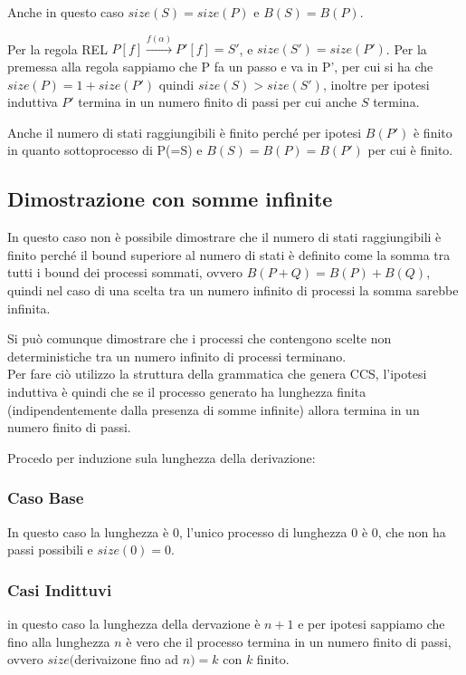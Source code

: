 \documentclass{article}
\newcommand{\passof}{\xrightarrow{f(\alpha)}}
\begin{document}
Anche in questo caso $ size(S) = size(P) $ e $ B(S)=B(P) $. 

Per la regola REL $P[f] \passof P'[f] =S'$, e $size(S') = size(P') $. Per la premessa alla regola sappiamo che P fa un passo e va in P', per cui si ha che $size(P) = 1+size(P')$ quindi $size(S)>size(S')$, inoltre per ipotesi induttiva $P'$ termina in un numero finito di passi per cui anche $S$ termina.

Anche il numero di stati raggiungibili è finito perché per ipotesi $B(P')$ è finito in quanto sottoprocesso di P(=S) e $B(S)=B(P)=B(P')$ per cui è finito.



\subsection{Dimostrazione con somme infinite}

In questo caso non è possibile dimostrare che il numero di stati raggiungibili è finito perché il bound superiore al numero di stati è definito come la somma tra tutti i bound dei processi sommati, ovvero $B(P+Q)=B(P)+B(Q)$, quindi nel caso di una scelta tra un numero infinito di processi la somma sarebbe infinita.

Si può comunque dimostrare che i processi che contengono scelte non deterministiche tra un numero infinito di processi terminano.\\

Per fare ciò utilizzo la struttura della grammatica che genera CCS,%
l'ipotesi induttiva è quindi che se il processo generato ha lunghezza finita (indipendentemente dalla presenza di somme infinite) allora termina in un numero finito di passi.

Procedo per induzione sula lunghezza della derivazione:

\subsubsection{Caso Base}
In questo caso la lunghezza è 0, l'unico processo di lunghezza 0 è $0$, che non ha passi possibili e $size(0)=0$.

\subsubsection{Casi Indittuvi}
in questo caso la lunghezza della dervazione è $n+1$ e per ipotesi sappiamo che fino alla lunghezza $n$ è vero che il processo termina in un numero finito di passi, ovvero $size($derivaizone fino ad $n) = k$ con $k$ finito.
\end{document}
